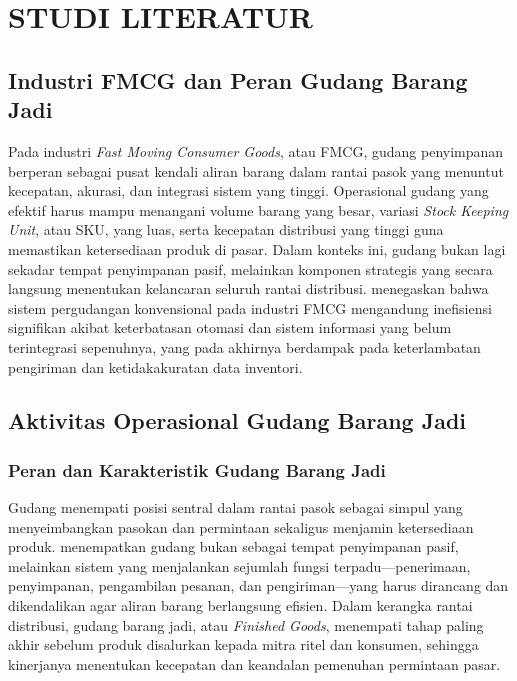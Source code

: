 \cleardoublepage %
\chapter{STUDI LITERATUR}
\label{chap:studi-literatur}

\section{Industri FMCG dan Peran Gudang Barang Jadi}
\label{sec:fmcg-warehouse}

Pada industri \textit{Fast Moving Consumer Goods}, atau FMCG, gudang penyimpanan berperan sebagai pusat kendali aliran barang dalam rantai pasok yang menuntut kecepatan, akurasi, dan integrasi sistem yang tinggi. Operasional gudang yang efektif harus mampu menangani volume barang yang besar, variasi \textit{Stock Keeping Unit}, atau SKU, yang luas, serta kecepatan distribusi yang tinggi guna memastikan ketersediaan produk di pasar. Dalam konteks ini, gudang bukan lagi sekadar tempat penyimpanan pasif, melainkan komponen strategis yang secara langsung menentukan kelancaran seluruh rantai distribusi. \textcite{framinan2025} menegaskan bahwa sistem pergudangan konvensional pada industri FMCG mengandung inefisiensi signifikan akibat keterbatasan otomasi dan sistem informasi yang belum terintegrasi sepenuhnya, yang pada akhirnya berdampak pada keterlambatan pengiriman dan ketidakakuratan data inventori.

\section{Aktivitas Operasional Gudang Barang Jadi}
\label{sec:operasional-gudang}

\subsection{Peran dan Karakteristik Gudang Barang Jadi}

Gudang menempati posisi sentral dalam rantai pasok sebagai simpul yang menyeimbangkan pasokan dan permintaan sekaligus menjamin ketersediaan produk. \textcite{rouwenhorst2000} menempatkan gudang bukan sebagai tempat penyimpanan pasif, melainkan sistem yang menjalankan sejumlah fungsi terpadu---penerimaan, penyimpanan, pengambilan pesanan, dan pengiriman---yang harus dirancang dan dikendalikan agar aliran barang berlangsung efisien. Dalam kerangka rantai distribusi, gudang barang jadi, atau \textit{Finished Goods}, menempati tahap paling akhir sebelum produk disalurkan kepada mitra ritel dan konsumen, sehingga kinerjanya menentukan kecepatan dan keandalan pemenuhan permintaan pasar.

